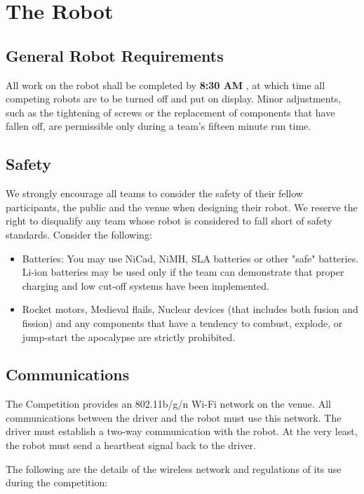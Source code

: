 \section{The Robot}
\subsection{General Robot Requirements}
All work on the robot shall be completed by \textbf{8:30 AM \competition}, at which time all competing robots are to be turned off and put on display. Minor adjustments, such as the tightening of screws or the replacement of components that have fallen off, are permissible only during a team’s fifteen minute run time.

\subsection{Safety}
We strongly encourage all teams to consider the safety of their fellow participants, the public and the venue when designing their robot. We reserve the right to disqualify any team whose robot is considered to fall short of safety standards. Consider the following:

\begin{itemize}
\item Batteries: You may use NiCad, NiMH, SLA batteries or other "safe" batteries. Li-ion batteries may be used only if the team can demonstrate that proper charging and low cut-off systems have been implemented.
\item Rocket motors, Medieval flails, Nuclear devices (that includes both fusion and fission) and any components that have a tendency to combust, explode, or jump-start the apocalypse are strictly prohibited.
\end{itemize}

\subsection{Communications}
The Competition provides an 802.11b/g/n Wi-Fi network on the venue. All communications between the driver and the robot must use this network. The driver must establish a two-way communication with the robot. At the very least, the robot must send a heartbeat signal back to the driver.

The following are the details of the wireless network and regulations of its use during the competition:

